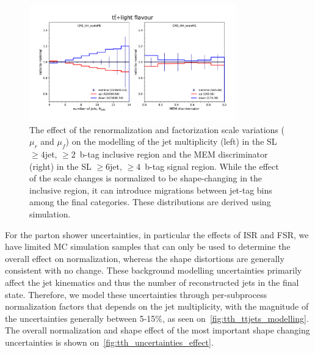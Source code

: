 \begin{figure}
\begin{centering}
\includegraphics[width=0.8\textwidth]{figures/tth/scaleME_unc.pdf}
\caption[The effect of $\mu_r$ and $\mu_f$ variations.]{The effect of the renormalization and factorization scale variations ($\mu_r$ and $\mu_f$) on the modelling of the jet multiplicity (left) in the SL $\geq4$jet, $\geq2$~b-tag inclusive region and the MEM discriminator (right) in the SL $\geq6$jet, $\geq4$~b-tag signal region. While the effect of the scale changes is normalized to be shape-changing in the inclusive region, it can introduce migrations between jet-tag bins among the final categories. These distributions are derived using \ttlf simulation.}
\label{fig:tth_scaleme}
\end{centering}
\end{figure}

For the parton shower uncertainties, in particular the effects of ISR and FSR, we have limited MC simulation samples that can only be used to determine the overall effect on normalization, whereas the shape distortions are generally consistent with no change. These background modelling uncertainties primarily affect the jet kinematics and thus the number of reconstructed jets in the final state. Therefore, we model these uncertainties through per-subprocess normalization factors that depends on the jet multiplicity, with the magnitude of the uncertainties generally between 5-15\%, as seen on~\cref{fig:tth_ttjets_modelling}. The overall normalization and shape effect of the most important shape changing uncertainties is shown on~\cref{fig:tth_uncertainties_effect}.

